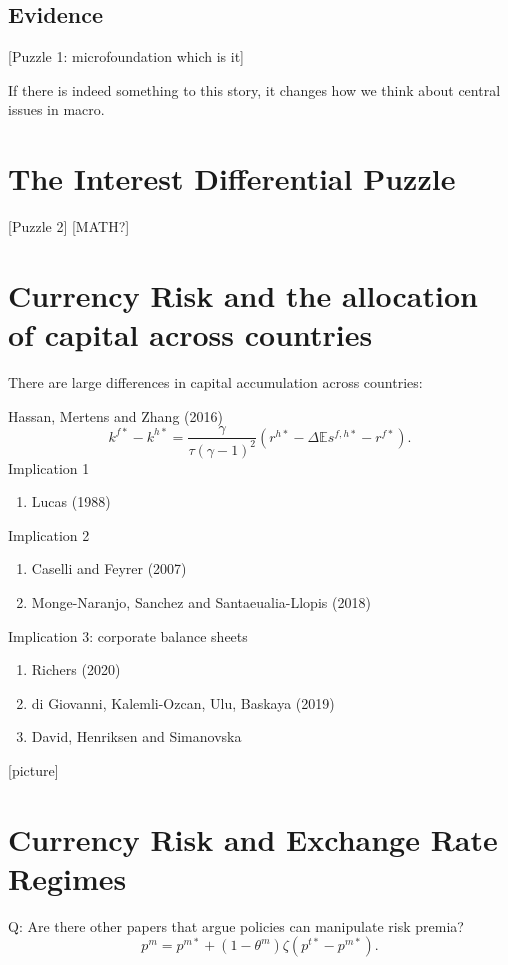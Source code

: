 \documentclass{ar-1col}
\begin{document}
\subsection{Evidence}

[Puzzle 1: microfoundation which is it]

If there is indeed something to this story, it changes how we think
about central issues in macro.



\section{The Interest Differential Puzzle}

[Puzzle 2] [MATH?]

\section{Currency Risk and the allocation of capital across countries}
There are large differences in capital accumulation across countries:

Hassan, Mertens and Zhang (2016)
\begin{equation}\label{eq_link_k_r}
  k^{f\ast}-k^{h\ast} = \frac{\gamma}{\tau(\gamma-1)^2}\left(r^{h \ast} - \Delta \mathbb{E} s^{f, h \ast} - r^{f \ast}\right).
\end{equation}
Implication 1
\begin{enumerate}
\item Lucas (1988)
\end{enumerate}
Implication 2
\begin{enumerate}
\item Caselli and Feyrer (2007)
\item Monge-Naranjo, Sanchez and Santaeualia-Llopis (2018)
\end{enumerate}
Implication 3: corporate balance sheets
\begin{enumerate}
\item Richers (2020)
\item di Giovanni, Kalemli-Ozcan, Ulu, Baskaya (2019)
\item David, Henriksen and Simanovska
\end{enumerate} [picture]
\section{Currency Risk and Exchange Rate Regimes}
Q: Are there other papers that argue policies can manipulate risk
premia?
\begin{equation*}
  p^m = p^{m \ast} + (1 - \theta^m) \zeta (p^{t \ast} - p^{m \ast}).
\end{equation*}
\end{document}
